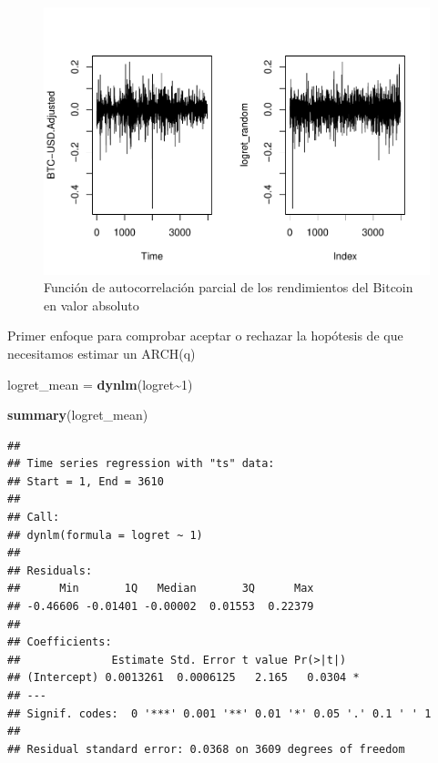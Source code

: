 \documentclass[
]{book}
\newenvironment{Shaded}{\begin{snugshade}}{\end{snugshade}}
\newcommand{\DecValTok}[1]{\textcolor[rgb]{0.00,0.00,0.81}{#1}}
\newcommand{\FunctionTok}[1]{\textcolor[rgb]{0.13,0.29,0.53}{\textbf{#1}}}
\newcommand{\NormalTok}[1]{#1}
\newcommand{\OtherTok}[1]{\textcolor[rgb]{0.56,0.35,0.01}{#1}}
\newcommand{\SpecialCharTok}[1]{\textcolor[rgb]{0.81,0.36,0.00}{\textbf{#1}}}
\begin{document}
\begin{figure}

{\centering \includegraphics{Notas-Series-Tiempo_files/figure-latex/fig109-1} 

}

\caption{Función de autocorrelación parcial de los rendimientos del Bitcoin en valor absoluto}\label{fig:fig109}
\end{figure}

Primer enfoque para comprobar aceptar o rechazar la hopótesis de que necesitamos estimar un ARCH(q)

\begin{Shaded}
\begin{Highlighting}[]
\NormalTok{logret\_mean }\OtherTok{=} \FunctionTok{dynlm}\NormalTok{(logret}\SpecialCharTok{\textasciitilde{}}\DecValTok{1}\NormalTok{)}

\FunctionTok{summary}\NormalTok{(logret\_mean)}
\end{Highlighting}
\end{Shaded}

\begin{verbatim}
## 
## Time series regression with "ts" data:
## Start = 1, End = 3610
## 
## Call:
## dynlm(formula = logret ~ 1)
## 
## Residuals:
##      Min       1Q   Median       3Q      Max 
## -0.46606 -0.01401 -0.00002  0.01553  0.22379 
## 
## Coefficients:
##              Estimate Std. Error t value Pr(>|t|)  
## (Intercept) 0.0013261  0.0006125   2.165   0.0304 *
## ---
## Signif. codes:  0 '***' 0.001 '**' 0.01 '*' 0.05 '.' 0.1 ' ' 1
## 
## Residual standard error: 0.0368 on 3609 degrees of freedom
\end{verbatim}
\end{document}
